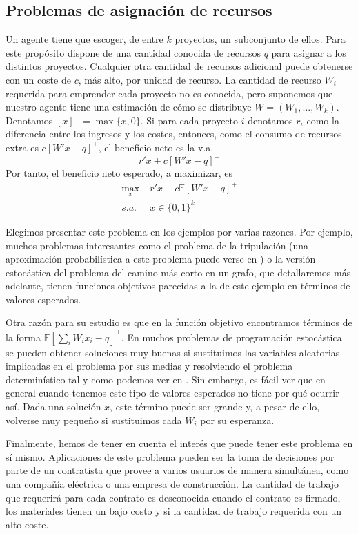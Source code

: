 \documentclass[twoside,a4paper,openright,12pt]{book}
\newcommand{\E}{\mathbb{E}}
\providecommand{\posi}[1]{\left[#1\right]^+}
\begin{document}
\newpage
\subsection{Problemas de asignación de recursos}

Un agente tiene que escoger, de entre $k$ proyectos, un subconjunto de ellos. Para este propósito dispone de una cantidad conocida de recursos $q$ para asignar a los distintos proyectos. Cualquier otra cantidad de recursos adicional puede obtenerse con un coste de $c$, más alto, por unidad de recurso. La cantidad de recurso $W_i$ requerida para emprender cada proyecto no es conocida, pero suponemos que nuestro agente tiene una estimación de cómo se distribuye $W=(W_1,\dotsc,W_k)$. Denotamos $\posi{x}=\max\{x,0\}$. Si para cada proyecto $i$ denotamos $r_i$ como la diferencia entre los ingresos y los costes, entonces, como el consumo de recursos extra es $c\left[W'x-q\right]^+$, el beneficio neto es la v.a. 
$$
r'x + c\left[W'x-q\right]^+
$$
Por tanto, el beneficio neto esperado, a maximizar, es
\begin{align*}	
\max_x&\; r'x  -c\E\posi{W'x-q}\tag{5}\label{eq:5}\\
s.a.& \; x\in\{0,1\}^k
\end{align*}

Elegimos presentar este problema en los ejemplos por varias razones. Por ejemplo, muchos problemas interesantes como el problema de la tripulación (una aproximación probabilística a este problema puede verse en \cite{avion}) o la versión estocástica del problema del camino más corto en un grafo, que detallaremos más adelante, tienen funciones objetivos parecidas a la de este ejemplo en términos de valores esperados.

Otra razón para su estudio es que en la función objetivo encontramos términos de la forma $\E\posi{\sum_i W_ix_i-q}$. En muchos problemas de programación estocástica se pueden obtener soluciones muy buenas si sustituimos las variables aleatorias implicadas en el problema por sus medias y resolviendo el problema determinístico tal y como podemos ver en \cite{cita1}. Sin embargo, es fácil ver que en general cuando tenemos este tipo de valores esperados no tiene por qué ocurrir así. Dada una solución $x$, este término puede ser grande y, a pesar de ello, volverse muy pequeño si sustituimos cada $W_i$ por su esperanza. 

Finalmente, hemos de tener en cuenta el interés que puede tener este problema en sí mismo. Aplicaciones de este problema pueden ser la toma de decisiones por parte de un contratista que provee a varios usuarios de manera simultánea, como una compañía eléctrica o una empresa de construcción. La cantidad de trabajo que requerirá para cada contrato es desconocida cuando el contrato es firmado, los materiales tienen un bajo costo y si la cantidad de trabajo requerida con un alto coste.
\end{document}
